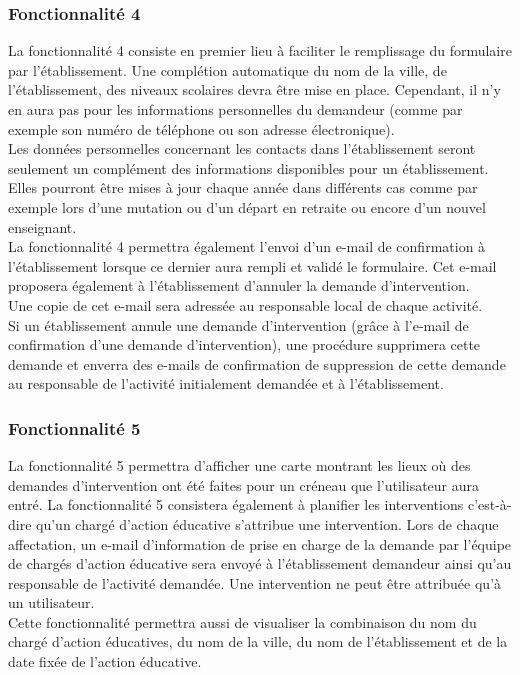 \subsubsection{Fonctionnalité 4}
La fonctionnalité 4 consiste en premier lieu à faciliter le remplissage du formulaire par l'établissement. 
Une complétion automatique du nom de la ville, de l'établissement, des niveaux scolaires devra être mise en place. Cependant, il n'y en aura pas pour les informations personnelles du demandeur (comme  par exemple son numéro de téléphone ou son adresse électronique).\\
Les données personnelles concernant les contacts dans l'établissement seront seulement un complément des informations disponibles pour un établissement. Elles pourront être mises à jour chaque année dans différents cas comme par exemple lors d'une mutation ou d'un départ en retraite ou encore d'un nouvel enseignant.   \\

La fonctionnalité 4 permettra également l'envoi d'un e-mail de confirmation à l'établissement lorsque ce dernier aura rempli et validé le formulaire. Cet e-mail proposera également à l'établissement d'annuler la demande d'intervention. \\ Une copie de cet e-mail sera adressée au responsable local de chaque activité.\\

Si un établissement annule une demande d'intervention (grâce à l'e-mail de confirmation d'une demande d'intervention), une procédure supprimera cette demande et enverra des e-mails de confirmation de suppression de cette demande au responsable de l'activité initialement demandée et à l'établissement.  

\subsubsection{Fonctionnalité 5}
La fonctionnalité 5 permettra d'afficher une carte montrant les lieux où des demandes d'intervention ont été faites pour un créneau que l'utilisateur aura entré.
La fonctionnalité 5 consistera également à planifier les interventions c'est-à-dire qu'un chargé d'action éducative s'attribue une intervention.
Lors de chaque affectation, un e-mail d'information de prise en charge de la demande par l'équipe de chargés d'action éducative sera envoyé à l'établissement demandeur ainsi qu'au responsable de l'activité demandée.
Une intervention ne peut être attribuée qu'à un utilisateur. \\
Cette fonctionnalité permettra aussi de visualiser la combinaison du nom du chargé d'action éducatives, du nom de la ville, du nom de l'établissement et de la date fixée de l'action éducative.

